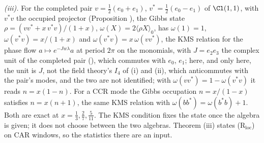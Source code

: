 \emph{(iii).} For the completed pair $v = \tfrac12(e_{0} + e_{1})$, $v^{*} = \tfrac12(e_{0} - e_{1})$ of $\Cl(1,1)$, with $v^{*}v$ the occupied projector (Proposition ), the Gibbs state $\rho = (vv^{*} + x\,v^{*}v)/(1 + x)$, $\omega(X) = 2\langle\rho X\rangle_{0}$, has $\omega(1) = 1$, $\omega(v^{*}v) = x/(1+x)$ and $\omega(v^{*}v) = x\,\omega(vv^{*})$, the KMS relation for the phase flow $a \mapsto e^{-Jw\lambda}a$ at period $2\pi$ on the monomials, with $J = e_{2}e_{3}$ the complex unit of the completed pair (), which commutes with $e_{0}$, $e_{1}$; here, and only here, the unit is $J$, not the field theory's $I_{4}$ of (i) and (ii), which anticommutes with the pair's modes, and the two are not identified; with $\omega(vv^{*}) = 1 - \omega(v^{*}v)$ it reads $n = x(1 - n)$. For a CCR mode the Gibbs occupation $n = x/(1 - x)$ satisfies $n = x(n + 1)$, the same KMS relation with $\omega(bb^{*}) = \omega(b^{*}b) + 1$. Both are exact at $x = \tfrac13, \tfrac27, \tfrac5{11}$. The KMS condition fixes the state once the algebra is given; it does not choose between the two algebras. Theorem (iii) states (R$_{\mathrm{loc}}$) on CAR windows, so the statistics there are an input.

